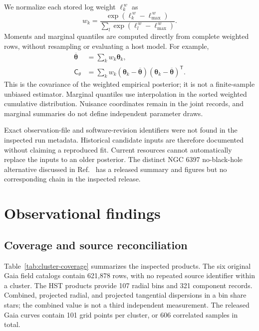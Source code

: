 \documentclass[aps,prd,reprint,amsmath,amssymb,superscriptaddress,nofootinbib,longbibliography,floatfix]{revtex4-2}
\begin{document}
We normalize each stored log weight $\ell_k^{\,w}$ as
\begin{equation}
w_k=\frac{\exp(\ell_k^{\,w}-\ell_{\max}^{\,w})}
{\sum_l\exp(\ell_l^{\,w}-\ell_{\max}^{\,w})}.
\label{eq:posterior-weights}
\end{equation}
Moments and marginal quantiles are computed directly from complete weighted rows, without resampling or evaluating a host model. For example,
\begin{align}
\overline{\boldsymbol\theta}&=\sum_k w_k\boldsymbol\theta_k,\\
\mathsf C_\theta&=\sum_k w_k
(\boldsymbol\theta_k-\overline{\boldsymbol\theta})
(\boldsymbol\theta_k-\overline{\boldsymbol\theta})^{\mathsf T}.
\label{eq:posterior-covariance}
\end{align}
This is the covariance of the weighted empirical posterior; it is not a finite-sample unbiased estimator. Marginal quantiles use interpolation in the sorted weighted cumulative distribution. Nuisance coordinates remain in the joint records, and marginal summaries do not define independent parameter draws.

Exact observation-file and software-revision identifiers were not found in the inspected run metadata. Historical candidate inputs are therefore documented without claiming a reproduced fit. Current resources cannot automatically replace the inputs to an older posterior. The distinct NGC 6397 no-black-hole alternative discussed in Ref.~\cite{Dickson2024} has a released summary and figures but no corresponding chain in the inspected release.

\section{Observational findings}\label{sec:findings}

\subsection{Coverage and source reconciliation}

Table~\ref{tab:cluster-coverage} summarizes the inspected products. The six original Gaia field catalogs contain 621,878 rows, with no repeated source identifier within a cluster. The HST products provide 107 radial bins and 321 component records. Combined, projected radial, and projected tangential dispersions in a bin share stars; the combined value is not a third independent measurement. The released Gaia curves contain 101 grid points per cluster, or 606 correlated samples in total.
\end{document}
